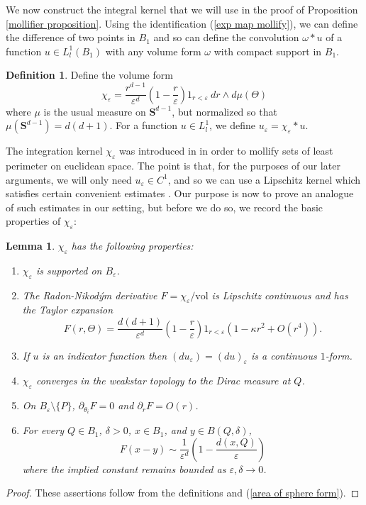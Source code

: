 \documentclass[reqno,12pt,letterpaper]{amsart}
\newcommand{\Sph}{\mathbf S}
\newcommand{\vol}{\mathrm{vol}}
\newtheorem{lemma}[theorem]{Lemma}
\theoremstyle{definition}
\newtheorem{definition}[theorem]{Definition}
\numberwithin{equation}{section}
\begin{document}
We now construct the integral kernel that we will use in the proof of Proposition \ref{mollifier proposition}.
Using the identification (\ref{exp map mollify}), we can define the difference of two points in $B_1$ and so can define the convolution $\omega * u$ of a function $u \in L^1_l(B_1)$ with any volume form $\omega$ with compact support in $B_1$.

\begin{definition}
Define the volume form
$$\chi_\varepsilon = \frac{r^{d - 1}}{\varepsilon^d}\left(1 - \frac{r}{\varepsilon}\right)1_{r < \varepsilon} ~dr \wedge d\mu(\Theta)$$
where $\mu$ is the usual measure on $\Sph^{d - 1}$, but normalized so that $\mu(\Sph^{d - 1}) = d(d + 1)$.
For a function $u \in L^1_l$, we define $u_\varepsilon = \chi_\varepsilon * u$.
\end{definition}

The integration kernel $\chi_\varepsilon$ was introduced in \cite[Chapter 7]{Giusti77} in order to mollify sets of least perimeter on euclidean space.
The point is that, for the purposes of our later arguments, we will only need $u_\varepsilon \in C^1$, and so we can use a Lipschitz kernel which satisfies certain convenient estimates \cite[Lemmata 7.1--7.2]{Giusti77}.
Our purpose is now to prove an analogue of such estimates in our setting, but before we do so, we record the basic properties of $\chi_\varepsilon$:

\begin{lemma}\label{mollifier props}
$\chi_\varepsilon$ has the following properties:
\begin{enumerate}
\item $\chi_\varepsilon$ is supported on $B_\varepsilon$.
\item The Radon-Nikod\'ym derivative $F = \chi_\varepsilon/\vol$ is Lipschitz continuous and has the Taylor expansion
\begin{equation}\label{RN mollify}
F(r, \Theta) = \frac{d(d + 1)}{\varepsilon^d} \left(1 - \frac{r}{\varepsilon}\right) 1_{r < \varepsilon}(1 - \kappa r^2 + O(r^4)).
\end{equation}
\item If $u$ is an indicator function then $(du_\varepsilon) = (du)_\varepsilon$ is a continuous $1$-form.
\item $\chi_\varepsilon$ converges in the weakstar topology to the Dirac measure at $Q$.
\item On $B_\varepsilon \setminus \{P\}$, $\partial_{\theta_i} F = 0$ and $\partial_r F = O(r)$.
\item For every $Q \in B_1$, $\delta > 0$, $x \in B_1$, and $y \in B(Q, \delta)$,
\begin{equation}\label{approximation of mollifier 2}
F(x - y) \sim \frac{1}{\varepsilon^d}\left(1 - \frac{d(x, Q)}{\varepsilon}\right)
\end{equation}
where the implied constant remains bounded as $\varepsilon,\delta \to 0$.
\end{enumerate}
\end{lemma}
\begin{proof}
These assertions follow from the definitions and (\ref{area of sphere form}).
\end{proof}
\end{document}
